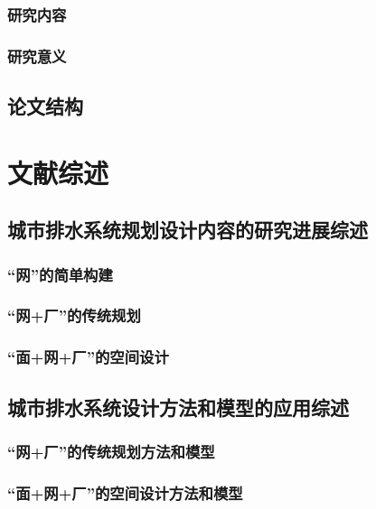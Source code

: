 \documentclass[degree=doctor]{sysuthesis}
\begin{document}
\subsection{研究内容}
\subsection{研究意义}

\clearpage
\setcounter{page}{9}
\section{论文结构}


\clearpage
\setcounter{page}{11}
\chapter{文献综述}
\section{城市排水系统规划设计内容的研究进展综述}
\subsection{“网”的简单构建}

\clearpage
\setcounter{page}{12}
\subsection{“网+厂”的传统规划}

\clearpage
\setcounter{page}{15}
\subsection{“面+网+厂”的空间设计}

\clearpage
\setcounter{page}{18}
\section{城市排水系统设计方法和模型的应用综述}
\subsection{“网+厂”的传统规划方法和模型}

\clearpage
\setcounter{page}{23}
\subsection{“面+网+厂”的空间设计方法和模型}
\end{document}
